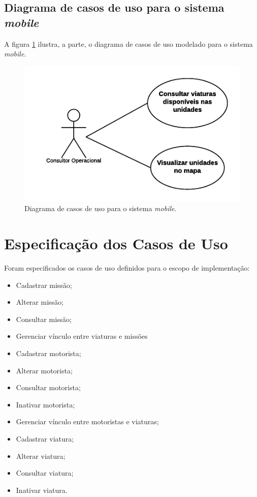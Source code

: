     \subsection{Diagrama de casos de uso para o sistema \textit{mobile}}
      
      A figura \ref{caso_de_uso_mobile} ilustra, a parte, o diagrama de casos de uso modelado para o sistema \textit{mobile}.
      
      \begin{figure}[!htbp]
	\centering
	\includegraphics[scale=1]{figuras/caso_de_uso_mobile}
	\caption[Diagrama de casos de uso para o sistema \textit{mobile}]{Diagrama de casos de uso para o sistema \textit{mobile}.}
	\label{caso_de_uso_mobile}
      \end{figure}
    
  \section{Especificação dos Casos de Uso}
 
    Foram especificados os casos de uso definidos para o escopo de implementação:
    
    \begin{itemize}
      \item Cadastrar missão;
      \item Alterar missão;
      \item Consultar missão;
      \item Gerenciar vínculo entre viaturas e missões
      \item Cadastrar motorista;
      \item Alterar motorista;
      \item Consultar motorista;
      \item Inativar motorista;
      \item Gerenciar vínculo entre motoristas e viaturas;
      \item Cadastrar viatura;
      \item Alterar viatura;
      \item Consultar viatura;
      \item Inativar viatura.
    \end{itemize}


